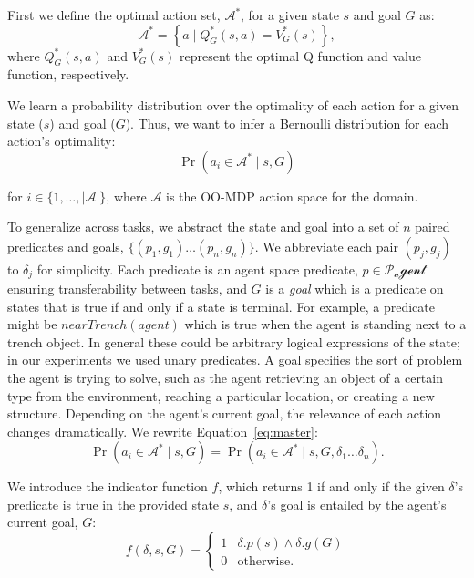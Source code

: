 \documentclass[11pt]{article}
\begin{document}
First we define the optimal action set, $\mathcal{A}^*$, for a
given state $s$ and goal $G$ as:
\begin{equation}
\mathcal{A}^* = \left\{ a \mid Q^*_G(s,a) = V^*_G(s) \right\}, 
\label{eq:opt_act_set}
\end{equation}
where $Q^*_G(s,a)$ and $V^*_G(s)$ represent the optimal Q function and 
value function, respectively.

We learn a probability distribution over the optimality of each action
for a given state ($s$) and goal ($G$). Thus, we want to infer a Bernoulli
distribution for each action's optimality:
\begin{equation}
\Pr(a_i \in \mathcal{A}^* \mid s, G)
\label{eq:master}
\end{equation}

\noindent for $i \in \{1, \ldots, |\mathcal{A}|\}$, where
$\mathcal{A}$ is the OO-MDP action space for the domain.

To generalize across tasks, we abstract the state
and goal into a set of $n$ paired predicates and goals, $\{
(p_1, g_1) \ldots (p_{n}, g_{n}) \}$. We abbreviate each pair $(p_j,
g_j)$ to $\delta_j$ for simplicity. Each predicate is an agent space predicate, $p \in
\mathcal{P_agent}$ ensuring transferability between tasks, and $G$ is a {\it goal} which is a
predicate on states that is true if and only if a state is terminal. For example, a
predicate might be $nearTrench(agent)$ which is true when the agent is
standing next to a trench object.  In general these could be arbitrary
logical expressions of the state; in our experiments we used unary
predicates. A goal specifies the sort of problem the agent is trying to solve, such as the agent
retrieving an object of a certain type from the environment, reaching
a particular location, or creating a new structure.  Depending on the
agent's current goal, the relevance of each action changes
dramatically.  We rewrite Equation~\ref{eq:master}:
\begin{equation}
\Pr(a_i \in \mathcal{A}^* \mid s, G) = \Pr(a_i \in \mathcal{A}^* \mid s, G, \delta_1 \ldots \delta_n).
\end{equation}

We introduce the indicator function $f$, which returns 1 if and only if the given $\delta$'s predicate is true in the provided state $s$, and $\delta$'s goal is entailed by the agent's current goal, $G$:
\begin{equation}
f(\delta, s, G) = 
\begin{cases}
1& \delta.p(s) \wedge \delta.g(G) \\
0& \text{otherwise.}
\end{cases}
\label{eq:f_func_def}
\end{equation}
\end{document}
